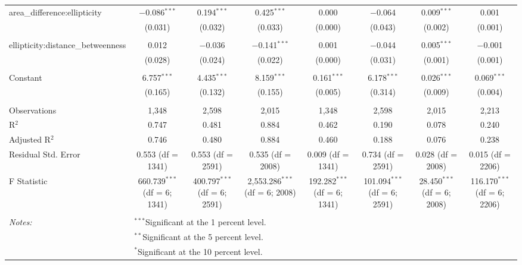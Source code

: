 \begin{table}[!htbp]
\begin{tabular}{@{\extracolsep{5pt}}lccccccc}
 area\_difference:ellipticity & $-$0.086$^{***}$ & 0.194$^{***}$ & 0.425$^{***}$ & 0.000 & $-$0.064 & 0.009$^{***}$ & 0.001 \\ 
  & (0.031) & (0.032) & (0.033) & (0.000) & (0.043) & (0.002) & (0.001) \\ 
  & & & & & & & \\ 
 ellipticity:distance\_betweenness & 0.012 & $-$0.036 & $-$0.141$^{***}$ & 0.001 & $-$0.044 & 0.005$^{***}$ & $-$0.001 \\ 
  & (0.028) & (0.024) & (0.022) & (0.000) & (0.031) & (0.001) & (0.001) \\ 
  & & & & & & & \\ 
 Constant & 6.757$^{***}$ & 4.435$^{***}$ & 8.159$^{***}$ & 0.161$^{***}$ & 6.178$^{***}$ & 0.026$^{***}$ & 0.069$^{***}$ \\ 
  & (0.165) & (0.132) & (0.155) & (0.005) & (0.314) & (0.009) & (0.004) \\ 
  & & & & & & & \\ 
Observations & 1,348 & 2,598 & 2,015 & 1,348 & 2,598 & 2,015 & 2,213 \\ 
R$^{2}$ & 0.747 & 0.481 & 0.884 & 0.462 & 0.190 & 0.078 & 0.240 \\ 
Adjusted R$^{2}$ & 0.746 & 0.480 & 0.884 & 0.460 & 0.188 & 0.076 & 0.238 \\ 
Residual Std. Error & 0.553 (df = 1341) & 0.553 (df = 2591) & 0.535 (df = 2008) & 0.009 (df = 1341) & 0.734 (df = 2591) & 0.028 (df = 2008) & 0.015 (df = 2206) \\ 
F Statistic & 660.739$^{***}$ (df = 6; 1341) & 400.797$^{***}$ (df = 6; 2591) & 2,553.286$^{***}$ (df = 6; 2008) & 192.282$^{***}$ (df = 6; 1341) & 101.094$^{***}$ (df = 6; 2591) & 28.450$^{***}$ (df = 6; 2008) & 116.170$^{***}$ (df = 6; 2206) \\ 
\hline \\[-1.8ex] 
\textit{Notes:} & \multicolumn{7}{l}{$^{***}$Significant at the 1 percent level.} \\ 
 & \multicolumn{7}{l}{$^{**}$Significant at the 5 percent level.} \\ 
 & \multicolumn{7}{l}{$^{*}$Significant at the 10 percent level.} \\ 
\end{tabular} 
\end{table} 
